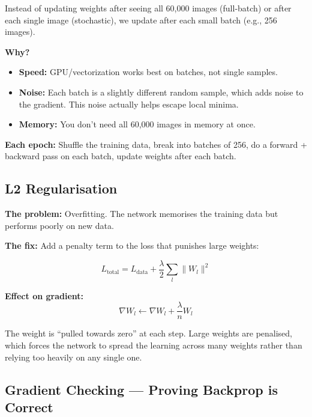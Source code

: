 \documentclass[12pt, a4paper]{article}
\begin{document}
Instead of updating weights after seeing all 60,000 images (full-batch) or after each single image (stochastic), we update after each small batch (e.g., 256 images).

\textbf{Why?}
\begin{itemize}
  \item \textbf{Speed:} GPU/vectorization works best on batches, not single samples.
  \item \textbf{Noise:} Each batch is a slightly different random sample, which adds noise to the gradient. This noise actually helps escape local minima.
  \item \textbf{Memory:} You don't need all 60,000 images in memory at once.
\end{itemize}

\textbf{Each epoch:} Shuffle the training data, break into batches of 256, do a forward + backward pass on each batch, update weights after each batch.

\subsection{L2 Regularisation}

\textbf{The problem:} Overfitting. The network memorises the training data but performs poorly on new data.

\textbf{The fix:} Add a penalty term to the loss that punishes large weights:

\begin{equation}
  L_{\text{total}} = L_{\text{data}} + \frac{\lambda}{2} \sum_{l} \|W_l\|^2
\end{equation}

\textbf{Effect on gradient:}
\begin{equation}
  \nabla W_l \leftarrow \nabla W_l + \frac{\lambda}{n} W_l
\end{equation}

The weight is ``pulled towards zero'' at each step. Large weights are penalised, which forces the network to spread the learning across many weights rather than relying too heavily on any single one.

\subsection{Gradient Checking --- Proving Backprop is Correct}
\end{document}
